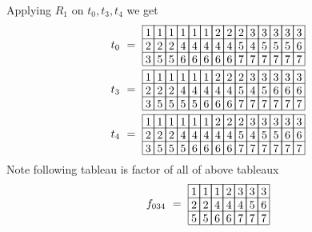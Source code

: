 {Applying \(R_1\) on \(t_0,t_3,t_4\)  we get
\begin{align*}
{\def\lr#1{\multicolumn{1}{|@{\hspace{.6ex}}c@{\hspace{.6ex}}|}{\raisebox{-.3ex}{$#1$}}}
\raisebox{-.6ex}{$t_0\ =\ \begin{array}[c]{*{14}c}\cline{1-14}
\lr{1}&\lr{1}&\lr{1}&\lr{1}&\lr{1}&\lr{1}&\lr{2}&\lr{2}&\lr{2}&\lr{3}&\lr{3}&\lr{3}&\lr{3}&\lr{3}\\\cline{1-14}
\lr{2}&\lr{2}&\lr{2}&\lr{4}&\lr{4}&\lr{4}&\lr{4}&\lr{4}&\lr{5}&\lr{4}&\lr{5}&\lr{5}&\lr{5}&\lr{6}\\\cline{1-14}
\lr{3}&\lr{5}&\lr{5}&\lr{6}&\lr{6}&\lr{6}&\lr{6}&\lr{6}&\lr{7}&\lr{7}&\lr{7}&\lr{7}&\lr{7}&\lr{7}\\\cline{1-14}
\end{array}$}
}\\
{\def\lr#1{\multicolumn{1}{|@{\hspace{.6ex}}c@{\hspace{.6ex}}|}{\raisebox{-.3ex}{$#1$}}}
\raisebox{-.6ex}{$t_3\ =\ \begin{array}[c]{*{14}c}\cline{1-14}
\lr{1}&\lr{1}&\lr{1}&\lr{1}&\lr{1}&\lr{1}&\lr{2}&\lr{2}&\lr{2}&\lr{3}&\lr{3}&\lr{3}&\lr{3}&\lr{3}\\\cline{1-14}
\lr{2}&\lr{2}&\lr{2}&\lr{4}&\lr{4}&\lr{4}&\lr{4}&\lr{4}&\lr{5}&\lr{4}&\lr{5}&\lr{6}&\lr{6}&\lr{6}\\\cline{1-14}
\lr{3}&\lr{5}&\lr{5}&\lr{5}&\lr{5}&\lr{6}&\lr{6}&\lr{6}&\lr{7}&\lr{7}&\lr{7}&\lr{7}&\lr{7}&\lr{7}\\\cline{1-14}
\end{array}$}
}\\
{\def\lr#1{\multicolumn{1}{|@{\hspace{.6ex}}c@{\hspace{.6ex}}|}{\raisebox{-.3ex}{$#1$}}}
\raisebox{-.6ex}{$t_4\ =\ \begin{array}[c]{*{14}c}\cline{1-14}
\lr{1}&\lr{1}&\lr{1}&\lr{1}&\lr{1}&\lr{1}&\lr{2}&\lr{2}&\lr{2}&\lr{3}&\lr{3}&\lr{3}&\lr{3}&\lr{3}\\\cline{1-14}
\lr{2}&\lr{2}&\lr{2}&\lr{4}&\lr{4}&\lr{4}&\lr{4}&\lr{4}&\lr{5}&\lr{4}&\lr{5}&\lr{5}&\lr{6}&\lr{6}\\\cline{1-14}
\lr{3}&\lr{5}&\lr{5}&\lr{5}&\lr{6}&\lr{6}&\lr{6}&\lr{6}&\lr{7}&\lr{7}&\lr{7}&\lr{7}&\lr{7}&\lr{7}\\\cline{1-14}
\end{array}$}
}
\end{align*}
Note following tableau is factor of all of above tableaux
\[
{\def\lr#1{\multicolumn{1}{|@{\hspace{.6ex}}c@{\hspace{.6ex}}|}{\raisebox{-.3ex}{$#1$}}}
\raisebox{-.6ex}{$f_{034}\ =\ \begin{array}[c]{*{7}c}\cline{1-7}
\lr{1}&\lr{1}&\lr{1}&\lr{2}&\lr{3}&\lr{3}&\lr{3}\\\cline{1-7}
\lr{2}&\lr{2}&\lr{4}&\lr{4}&\lr{4}&\lr{5}&\lr{6}\\\cline{1-7}
\lr{5}&\lr{5}&\lr{6}&\lr{6}&\lr{7}&\lr{7}&\lr{7}\\\cline{1-7}
\end{array}$}
}
\]
}
